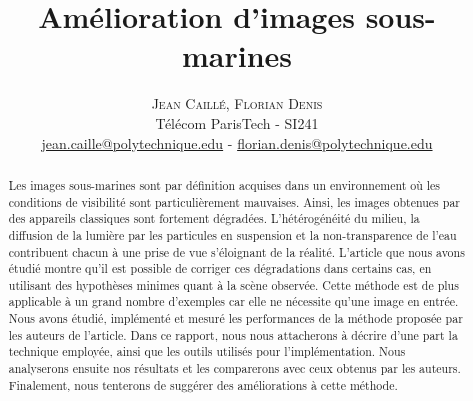 \documentclass[twoside]{article}
\title{\vspace{-15mm}\fontsize{24pt}{10pt}\selectfont\textbf{Amélioration d'images sous-marines}} %
\author{
\large
\textsc{Jean Caillé, Florian Denis}\\[2mm] %
\normalsize Télécom ParisTech - SI241 \\ %
\normalsize \href{mailto:jean.caille@polytechnique.edu}{jean.caille@polytechnique.edu} - \href{mailto:florian.denis@polytechnique.edu}{florian.denis@polytechnique.edu}  %
\vspace{-5mm}
}
\date{}
\begin{document}
\maketitle %

\thispagestyle{fancy} %


\vspace{0.5cm}
\begin{abstract}
Les images sous-marines sont par définition acquises dans un environnement où les conditions de visibilité sont particulièrement mauvaises. Ainsi, les images obtenues par des appareils classiques sont fortement dégradées. L'hétérogénéité du milieu, la diffusion de la lumière par les particules en suspension et la non-transparence de l'eau contribuent chacun à une prise de vue s'éloignant de la réalité. L'article que nous avons étudié montre qu'il est possible de corriger ces dégradations dans certains cas, en utilisant des hypothèses minimes quant à la scène observée. Cette méthode est de plus applicable à un grand nombre d'exemples car elle ne nécessite qu'une image en entrée.\\
Nous avons étudié, implémenté et mesuré les performances de la méthode proposée par les auteurs de l'article. Dans ce rapport, nous nous attacherons à décrire d'une part la technique employée, ainsi que les outils utilisés pour l'implémentation. Nous analyserons ensuite nos résultats et les comparerons avec ceux obtenus par les auteurs. Finalement, nous tenterons de suggérer des améliorations à cette méthode.\\

\end{abstract}

\end{document}
